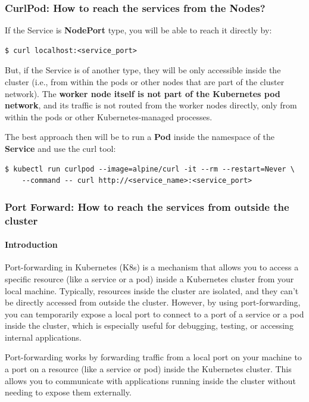 \documentclass{article}
\newenvironment{codetemplate}[1][]{%
  \mybasecolorbox[#1]
  \itshape
}{%
  \endmybasecolorbox
}
\begin{document}
\subsubsection{CurlPod: How to reach the services from the Nodes?}
If the Service is \textbf{NodePort} type, you will be able to reach it directly by:
\begin{codetemplate}{}
\begin{verbatim}
$ curl localhost:<service_port>
\end{verbatim}
\end{codetemplate}

But, if the Service is of another type, they will be only accessible inside the cluster (i.e., from within the pods or other nodes that are part of the cluster network). The \textbf{worker node itself is not part of the Kubernetes pod network}, and its traffic is not routed from the worker nodes directly, only from within the pods or other Kubernetes-managed processes.

The best approach then will be to run a \textbf{Pod} inside the namespace of the \textbf{Service} and use the curl tool:

\begin{codetemplate}{}
\begin{verbatim}
$ kubectl run curlpod --image=alpine/curl -it --rm --restart=Never \
    --command -- curl http://<service_name>:<service_port>
\end{verbatim}
\end{codetemplate}

\subsubsection{Port Forward: How to reach the services from outside the cluster}
\paragraph{Introduction}
Port-forwarding in Kubernetes (K8s) is a mechanism that allows you to access a specific resource (like a service or a pod) inside a Kubernetes cluster from your local machine. Typically, resources inside the cluster are isolated, and they can't be directly accessed from outside the cluster. However, by using port-forwarding, you can temporarily expose a local port to connect to a port of a service or a pod inside the cluster, which is especially useful for debugging, testing, or accessing internal applications.

Port-forwarding works by forwarding traffic from a local port on your machine to a port on a resource (like a service or pod) inside the Kubernetes cluster. This allows you to communicate with applications running inside the cluster without needing to expose them externally.
\end{document}
